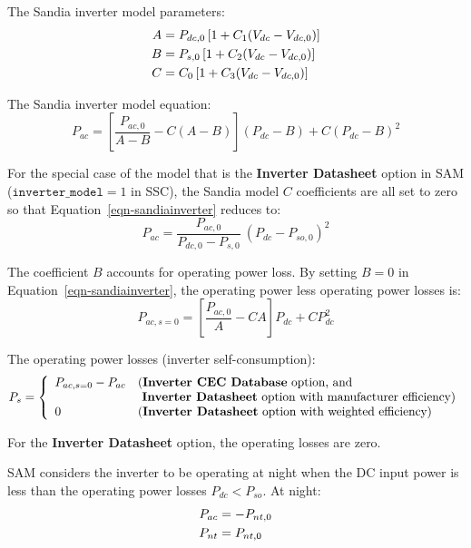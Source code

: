 \documentclass[12pt,letterpaper]{article}
\begin{document}
The Sandia inverter model parameters:
\begin{align}
A &=P_{dc,0} \left[ 1+ C_1 ( V_{dc} - V_{dc,0} )\right] \notag\\
B &= P_{s,0}  \left[ 1+ C_2 ( V_{dc} - V_{dc,0} )\right] \notag\\
C &= C_0  \left[ 1+ C_3 ( V_{dc} - V_{dc,0} )\right]
\end{align}

The Sandia inverter model equation:
\begin{equation}\label{eqn-sandiainverter}
P_{ac} = \left[ \frac{P_{ac,0}}{A-B} - C ( A - B ) \right] ( P_{dc} - B ) + C ( P_{dc} - B )^2
\end{equation}

For the special case of the model that is the \textbf{Inverter Datasheet} option in SAM ($\mathtt{inverter\_model} = 1$ in SSC), the Sandia model $C$ coefficients are all set to zero so that Equation~\ref{eqn-sandiainverter} reduces to:
\begin{equation}
P_{ac} = \frac{P_{ac,0}}{P_{dc,0}-P_{s,0}}~( P_{dc} - P_{so,0} )^2
\end{equation}

The coefficient $B$ accounts for operating power loss. By setting $B=0$ in Equation~\ref{eqn-sandiainverter}, the operating power less operating power losses is:
\begin{equation}
P_{ac,s=0} = \left[ \frac{P_{ac,0}}{A} - C A \right] P_{dc} + C P_{dc}^2
\end{equation}

The operating power losses (inverter self-consumption):
\begin{equation}
P_{s} = \left\{
\begin{array}{ll}
P_{ac,s=0} - P_{ac} & \text{(\textbf{Inverter CEC Database} option, and } \\
 & \text{~\textbf{Inverter Datasheet} option with manufacturer efficiency)} \\
0 & \text{(\textbf{Inverter Datasheet} option with weighted efficiency)}
\end{array}
\right.
\end{equation}

For the \textbf{Inverter Datasheet} option, the operating losses are zero.

SAM considers the inverter to be operating at night when the DC input power is less than the operating power losses $P_{dc} < P_{so}$. At night:
\begin{align}
P_{ac} &= -P_{nt,0} \notag\\
P_{nt} &= P_{nt,0}
\end{align}
\end{document}
